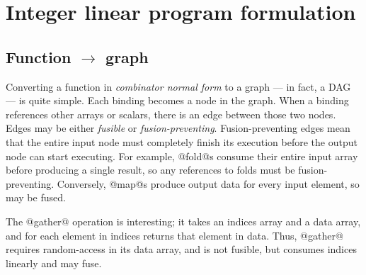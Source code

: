 \section{Integer linear program formulation}

\subsection{Function $\to$ graph}
Converting a function in \emph{combinator normal form} to a graph --- in fact, a DAG --- is quite simple.
Each binding becomes a node in the graph.
When a binding references other arrays or scalars, there is an edge between those two nodes.
Edges may be either \emph{fusible} or \emph{fusion-preventing}.
Fusion-preventing edges mean that the entire input node must completely finish its execution before the output node can start executing.
For example, @fold@s consume their entire input array before producing a single result, so any references to folds must be fusion-preventing.
Conversely, @map@s produce output data for every input element, so may be fused.

The @gather@ operation is interesting; it takes an indices array and a data array, and for each element in indices returns that element in data.
Thus, @gather@ requires random-access in its data array, and is not fusible, but consumes indices linearly and may fuse.

